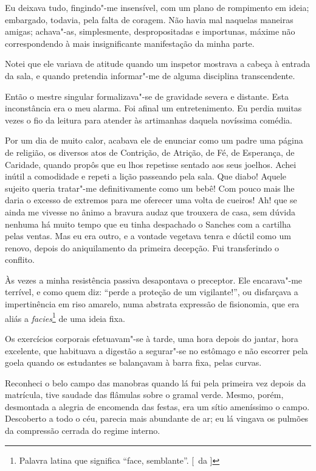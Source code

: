 Eu deixava tudo, fingindo"-me insensível, com um plano de rompimento em ideia;
embargado, todavia, pela falta de coragem. Não havia mal naquelas
maneiras amigas; achava"-as, simplesmente, despropositadas e
importunas, máxime não correspondendo à mais insignificante
manifestação da minha parte. 

Notei que ele variava de atitude quando um
inspetor mostrava a cabeça à entrada da sala, e quando pretendia
informar"-me de alguma disciplina transcendente. 

Então o mestre singular formalizava"-se de gravidade severa e distante. 
Esta inconstância era o meu alarma. Foi afinal um entretenimento. Eu perdia
muitas vezes o fio da leitura para atender às artimanhas daquela
novíssima comédia. 

Por um dia de muito calor, acabava ele de enunciar
como um padre uma página de religião, os diversos atos de Contrição, de
Atrição, de Fé, de Esperança, de Caridade, quando propôs que eu lhos
repetisse sentado aos seus joelhos. Achei inútil a comodidade e repeti
a lição passeando pela sala. Que diabo! Aquele sujeito queria
tratar"-me definitivamente como um bebê! Com pouco mais lhe daria o
excesso de extremos para me oferecer uma volta de cueiros! Ah! que se
ainda me vivesse no ânimo a bravura audaz que trouxera de casa, sem
dúvida nenhuma há muito tempo que eu tinha despachado o Sanches com a
cartilha pelas ventas. Mas eu era outro, e a vontade vegetava tenra e
dúctil como um renovo, depois do aniquilamento da primeira decepção.
Fui transferindo o conflito. 

Às vezes a minha resistência passiva
desapontava o preceptor. Ele encarava"-me terrível, e como quem diz:
``perde a proteção de um vigilante!'', ou disfarçava a impertinência em
riso amarelo, numa abstrata expressão de fisionomia, que era aliás a 
\textit{facies}\footnote{ Palavra latina que significa ``face, semblante''.  
[~da ]} de uma ideia fixa. 

Os exercícios corporais efetuavam"-se à tarde, uma hora depois
do jantar, hora excelente, que habituava a digestão a segurar"-se no
estômago e não escorrer pela goela quando os estudantes se balançavam à
barra fixa, pelas curvas. 

Reconheci o belo campo das manobras quando lá
fui pela primeira vez depois da matrícula, tive saudade das flâmulas
sobre o gramal verde. Mesmo, porém, desmontada a alegria de encomenda
das festas, era um sítio ameníssimo o campo. Descoberto a todo o céu,
parecia mais abundante de ar; eu lá vingava os pulmões da compressão
cerrada do regime interno. 

